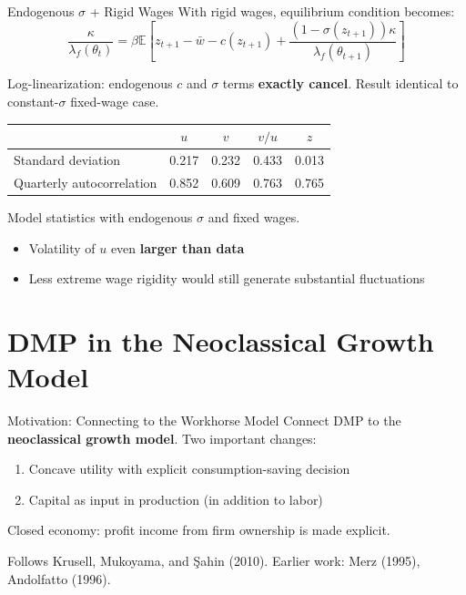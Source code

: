 \documentclass[blue]{beamer}
\newcommand{\E}{\mathbb{E}}
\begin{document}
\begin{frame}{Endogenous $\sigma$ + Rigid Wages}
	With rigid wages, equilibrium condition becomes:
	\[
	\frac{\kappa}{\lambda_f(\theta_t)} = \beta \E\!\left[z_{t+1} - \bar{w} - c(z_{t+1}) + \frac{(1 - \sigma(z_{t+1})) \kappa}{\lambda_f(\theta_{t+1})}\right]
	\]
	
	Log-linearization: endogenous $c$ and $\sigma$ terms \textbf{exactly cancel}. Result identical to constant-$\sigma$ fixed-wage case.
	
	\begin{table}
		\centering
		\small
		\begin{tabular}{lcccc}
			\toprule
			& $u$ & $v$ & $v/u$ & $z$ \\
			\midrule
			Standard deviation & 0.217 & 0.232 & 0.433 & 0.013 \\
			Quarterly autocorrelation & 0.852 & 0.609 & 0.763 & 0.765 \\
			\bottomrule
		\end{tabular}
		
		Model statistics with endogenous $\sigma$ and fixed wages.
	\end{table}
	\begin{itemize}
		\item Volatility of $u$ even \textbf{larger than data}
		\item Less extreme wage rigidity would still generate substantial fluctuations
	\end{itemize}
\end{frame}

\section{DMP in the Neoclassical Growth Model}

\begin{frame}{Motivation: Connecting to the Workhorse Model}
	Connect DMP to the \textbf{neoclassical growth model}. Two important changes:
	\begin{enumerate}
		\item Concave utility with explicit consumption-saving decision
		\item Capital as input in production (in addition to labor)
	\end{enumerate}
	
	\bigskip
	Closed economy: profit income from firm ownership is made explicit.
	
	\bigskip
	Follows Krusell, Mukoyama, and \c{S}ahin (2010). Earlier work: Merz (1995), Andolfatto (1996).
\end{frame}
\end{document}
